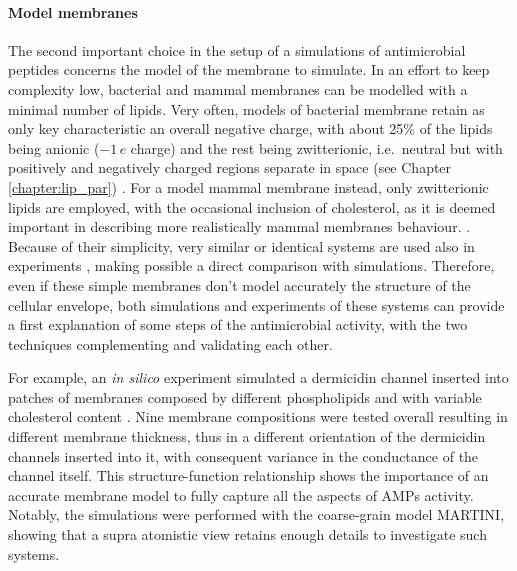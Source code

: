 \paragraph{Model membranes} The second important choice in the setup of a simulations of antimicrobial peptides concerns the model of the membrane to simulate. In an effort to keep complexity low, bacterial and mammal membranes can be modelled with a minimal number of lipids.
%
Very often, models of bacterial membrane retain as only key characteristic an overall negative charge, with about 25\% of the lipids being anionic ($-1\,e$ charge) and the rest being zwitterionic, i.e.\ neutral but with positively and negatively charged regions separate in space (see Chapter \ref{chapter:lip_par}) \cite{Lipkin2017,Wang2012,Zhao2018,Chen2019}.
For a model mammal membrane instead, only zwitterionic lipids are employed, with the occasional inclusion of cholesterol, as it is deemed important in describing more realistically mammal membranes behaviour. \cite{Lipkin2017,Wang2012,Zhao2018,Chen2019,Risselada2008}.
Because of their simplicity, very similar or identical systems are used also in experiments \cite{Castelletto2016,Tang2009,Glukhov2005}, making possible a direct comparison with simulations.
Therefore, even if these simple membranes don't model accurately the structure of the cellular envelope, both simulations and experiments of these systems can provide a first explanation of some steps of the antimicrobial activity, with the two techniques complementing and validating each other.

For example, an \emph{in silico} experiment simulated a dermicidin channel inserted into patches of membranes composed by different phospholipids and with variable cholesterol content \cite{Song2019}. Nine membrane compositions were tested overall resulting in different membrane thickness, thus in a different orientation of the dermicidin channels inserted into it, with consequent variance in the conductance of the channel itself. This structure-function relationship shows the importance of an accurate membrane model to fully capture all the aspects of AMPs activity. Notably, the simulations were performed with the coarse-grain model MARTINI, showing that a supra atomistic view retains enough details to investigate such systems.


